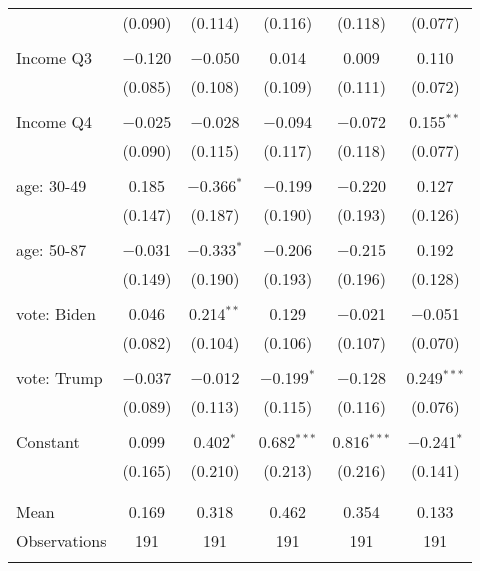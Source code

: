 \begin{tabular}{@{\extracolsep{5pt}}lccccc}
  & (0.090) & (0.114) & (0.116) & (0.118) & (0.077) \\ 
  & & & & & \\ 
 Income Q3 & $-$0.120 & $-$0.050 & 0.014 & 0.009 & 0.110 \\ 
  & (0.085) & (0.108) & (0.109) & (0.111) & (0.072) \\ 
  & & & & & \\ 
 Income Q4 & $-$0.025 & $-$0.028 & $-$0.094 & $-$0.072 & 0.155$^{**}$ \\ 
  & (0.090) & (0.115) & (0.117) & (0.118) & (0.077) \\ 
  & & & & & \\ 
 age: 30-49 & 0.185 & $-$0.366$^{*}$ & $-$0.199 & $-$0.220 & 0.127 \\ 
  & (0.147) & (0.187) & (0.190) & (0.193) & (0.126) \\ 
  & & & & & \\ 
 age: 50-87 & $-$0.031 & $-$0.333$^{*}$ & $-$0.206 & $-$0.215 & 0.192 \\ 
  & (0.149) & (0.190) & (0.193) & (0.196) & (0.128) \\ 
  & & & & & \\ 
 vote: Biden & 0.046 & 0.214$^{**}$ & 0.129 & $-$0.021 & $-$0.051 \\ 
  & (0.082) & (0.104) & (0.106) & (0.107) & (0.070) \\ 
  & & & & & \\ 
 vote: Trump & $-$0.037 & $-$0.012 & $-$0.199$^{*}$ & $-$0.128 & 0.249$^{***}$ \\ 
  & (0.089) & (0.113) & (0.115) & (0.116) & (0.076) \\ 
  & & & & & \\ 
 Constant & 0.099 & 0.402$^{*}$ & 0.682$^{***}$ & 0.816$^{***}$ & $-$0.241$^{*}$ \\ 
  & (0.165) & (0.210) & (0.213) & (0.216) & (0.141) \\ 
  & & & & & \\ 
\hline \\[-1.8ex] 
Mean & 0.169 & 0.318 & 0.462 & 0.354 & 0.133 \\ 
Observations & 191 & 191 & 191 & 191 & 191 \\ 
\hline 
\hline \\[-1.8ex] 
\end{tabular} 
